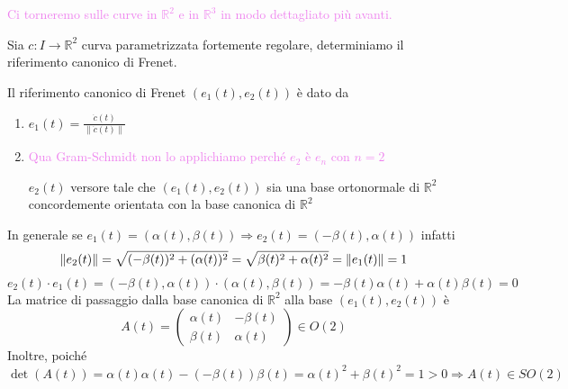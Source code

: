         \begin{esempio}
        \mbox{}

        \textcolor{violet}{Ci torneremo sulle curve in $\mathbb{R}^2$ e in $\mathbb{R}^3$ in modo dettagliato più avanti.}

        Sia $c:I \to \mathbb{R}^2$ curva parametrizzata fortemente regolare, determiniamo il riferimento canonico di Frenet.

        Il riferimento canonico di Frenet $(e_1(t), e_2(t))$ è dato da
        \begin{enumerate}
            \item $\displaystyle e_1(t) = \frac{\dot{c}(t)}{\|\dot{c}(t)\|}$
            \item \textcolor{violet}{Qua Gram-Schmidt non lo applichiamo perché $e_2$ è $e_n$ con $n=2$} 
            
            $e_2(t)$ versore tale che $(e_1(t), e_2(t))$ sia una base ortonormale di $\mathbb{R}^2$ concordemente orientata con la base canonica di $\mathbb{R}^2$
        \end{enumerate}
        In generale se $e_1(t)=\left(\alpha(t), \beta(t)\right) \Rightarrow e_2(t) = \left(-\beta(t), \alpha(t)\right)$ infatti
        \[ \lVert e_2(t)\rVert = \sqrt{(-\beta(t))^2 + (\alpha(t))^2} = \sqrt{\beta(t)^2 + \alpha(t)^2} = \lVert e_1(t)\rVert =1 \]
        \[ e_2(t) \cdot e_1(t) = (-\beta(t), \alpha(t)) \cdot (\alpha(t), \beta(t)) = -\beta(t)\alpha(t) + \alpha(t)\beta(t) = 0 \]
        La matrice di passaggio dalla base canonica di $\mathbb{R}^2$ alla base $(e_1(t), e_2(t))$ è
        \[ A(t) = \begin{pmatrix}
        \alpha(t) & -\beta(t) \\
        \beta(t) & \alpha(t)
        \end{pmatrix} \in O(2) \]
        Inoltre, poiché $\det(A(t)) = \alpha(t)\alpha(t) - (-\beta(t))\beta(t) = \alpha(t)^2 + \beta(t)^2 = 1 > 0 \Rightarrow A(t) \in SO(2)$
        \end{esempio}
        \newpage
